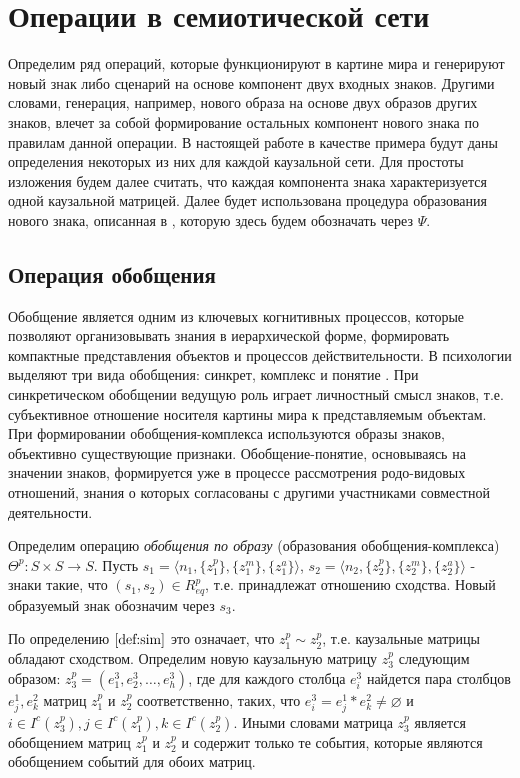 \documentclass[12pt]{scrartcl}
\begin{document}
	\section{Операции в семиотической сети}
	Определим ряд операций, которые функционируют в картине мира и генерируют новый знак либо сценарий на основе компонент двух входных знаков. Другими словами, генерация, например, нового образа на основе двух образов других знаков, влечет за собой формирование остальных компонент нового знака по  правилам данной операции. В настоящей работе в качестве примера будут даны определения некоторых из них для каждой каузальной сети. Для простоты изложения будем далее считать, что каждая компонента знака характеризуется одной каузальной матрицей. Далее будет использована процедура образования нового знака, описанная в \cite{Osipov2014c}, которую здесь будем обозначать через $\Psi$.
	
	\subsection{Операция обобщения}
	
	Обобщение является одним из ключевых когнитивных процессов, которые позволяют организовывать знания в иерархической форме, формировать компактные представления объектов и процессов действительности. В психологии выделяют три вида обобщения: синкрет, комплекс и понятие \cite{Vygotsky1999}. При синкретическом обобщении ведущую роль играет личностный смысл знаков, т.е. субъективное отношение носителя картины мира к представляемым объектам. При формировании обобщения-комплекса используются образы знаков, объективно существующие признаки. Обобщение-понятие, основываясь на значении знаков, формируется уже в процессе рассмотрения родо-видовых отношений, знания о которых согласованы с другими участниками совместной деятельности.
	
	Определим операцию \textit{обобщения по образу} (образования обобщения-комплекса) $\Theta^p: S\times S\rightarrow S$. Пусть $s_1=\langle n_1, \{z_1^p\}, \{z_1^m\}, \{z_1^a\} \rangle$, $s_2=\langle n_2, \{z_2^p\}, \{z_2^m\}, \{z_2^a\} \rangle$ - знаки такие, что $(s_1,s_2)\in R_{eq}^p$, т.е. принадлежат отношению сходства. Новый образуемый знак обозначим через $s_3$. 
	
	По определению $\autoref{def:sim}$ это означает, что $z_1^p\sim z_2^p$, т.е. каузальные матрицы обладают сходством. Определим новую каузальную матрицу $z_3^p$ следующим образом: $z_3^p=(e_1^3,e_2^3,\dots,e_h^3)$, где для каждого столбца $e_i^3$ найдется пара столбцов $e_j^1, e_k^2$ матриц $z_1^p$ и $z_2^p$ соответственно, таких, что $e_i^3=e_j^1*e_k^2\not=\varnothing$ и $i\in I^c(z_3^p), j\in I^c(z_1^p), k\in I^c(z_2^p)$. Иными словами матрица $z_3^p$ является обобщением матриц $z_1^p$ и $z_2^p$ и содержит только те события, которые являются обобщением событий для обоих матриц.
	
\end{document}
